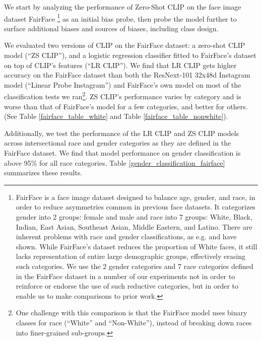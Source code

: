 \documentclass{article}
\begin{document}
We start by analyzing the performance of Zero-Shot CLIP on the face image dataset FairFace \citep{1908.04913}\footnote{FairFace is a face image dataset designed to balance age, gender, and race, in order to reduce asymmetries common in previous face datasets. It categorizes gender into 2 groups: female and male and race into 7 groups: White, Black, Indian, East Asian, Southeast Asian, Middle Eastern, and Latino. There are inherent problems with race and gender classifications, as e.g. \citet{bowker2000sorting} and \citet{keyes2018misgendering} have shown. While FairFace’s dataset reduces the proportion of White faces, it still lacks representation of entire large demographic groups, effectively erasing such categories. We use the 2 gender categories and 7 race categories defined in the FairFace dataset in a number of our experiments not in order to reinforce or endorse the use of such reductive categories, but in order to enable us to make comparisons to prior work.} as an initial bias probe, then probe the model further to surface additional biases and sources of biases, including class design.

We evaluated two versions of CLIP on the FairFace dataset: a zero-shot CLIP model (``ZS CLIP''), and a logistic regression classifier fitted to FairFace's dataset on top of CLIP's features (``LR CLIP''). We find that LR CLIP gets higher accuracy on the FairFace dataset than both the ResNext-101 32x48d Instagram model (``Linear Probe Instagram'') \citep{mahajan2018exploring} and FairFace's own model on most of the classification tests we ran\footnote{One challenge with this comparison is that the FairFace model uses binary classes for race (``White'' and ``Non-White''), instead of breaking down races into finer-grained sub-groups.}. ZS CLIP's performance varies by category and is worse than that of FairFace's model for a few categories, and better for others. (See Table \ref{fairface_table_white} and Table \ref{fairface_table_nonwhite}).



Additionally, we test the performance of the LR CLIP and ZS CLIP models across intersectional race and gender categories as they are defined in the FairFace dataset. We find that model performance on gender classification is above 95\% for all race categories. Table \ref{gender_classification_fairface} summarizes these results.
\end{document}
